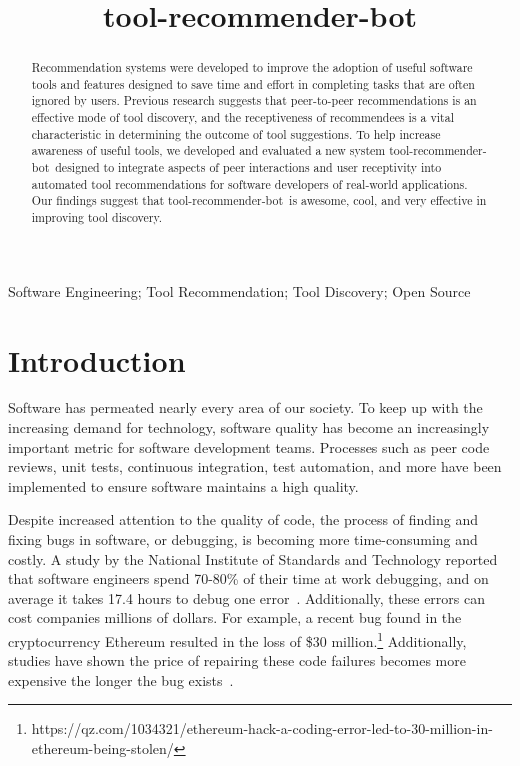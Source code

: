 \documentclass[conference]{IEEEtran}
\newcommand{\tool}{tool-recommender-bot}
\begin{document}

\title{\tool}

\author{
}

\maketitle
\begin{abstract}
Recommendation systems were developed to improve the adoption of useful software tools and features designed to save time and effort in completing tasks that are often ignored by users. Previous research suggests that peer-to-peer recommendations is an effective mode of tool discovery, and the receptiveness of recommendees is a vital characteristic in determining the outcome of tool suggestions. To help increase awareness of useful tools, we developed and evaluated a new system \tool~designed to integrate aspects of peer interactions and user receptivity into automated tool recommendations for software developers of real-world applications. Our findings suggest that \tool~is awesome, cool, and very effective in improving tool discovery.
\end{abstract}

\begin{IEEEkeywords}
Software Engineering; Tool Recommendation; Tool Discovery; Open Source
\end{IEEEkeywords}

\section{Introduction}

Software has permeated nearly every area of our society. To keep up with the increasing demand for technology, software quality has become an increasingly important metric for software development teams. Processes such as peer code reviews, unit tests, continuous integration, test automation, and more have been implemented to ensure software maintains a high quality. 

Despite increased attention to the quality of code, the process of finding and fixing bugs in software, or debugging, is becoming more time-consuming and costly.  A study by the National Institute of Standards and Technology reported that software engineers spend 70-80\% of their time at work debugging, and on average it takes 17.4 hours to debug one error~\cite{NIST}. Additionally, these errors can cost companies millions of dollars.  For example, a recent bug found in the cryptocurrency Ethereum resulted in the loss of \$30 million.\footnote{https://qz.com/1034321/ethereum-hack-a-coding-error-led-to-30-million-in-ethereum-being-stolen/} Additionally, studies have shown the price of repairing these code failures becomes more expensive the longer the bug exists~\cite{SEEconomics}.
\end{document}
